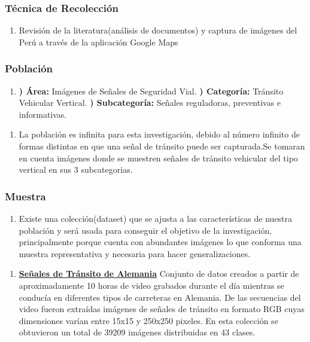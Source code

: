 		\subsubsection{Técnica de Recolección}
		\begin{enumerate}		
			\item[]  Revisión de la literatura(análisis de documentos) y captura de imágenes del Perú a través de la aplicación Google Maps
		\end{enumerate}

		\subsubsection{Población} 
		\begin{enumerate}
		\item[]				
		{\bf *) Área:} Imágenes de Señales de Seguridad Vial.\vskip 0.1cm
		{\bf *) Categoría:} Tránsito Vehicular Vertical.\vskip 0.1cm
		{\bf *) Subcategoría:} Señales reguladoras, preventivas e informativas.\vskip 0.1cm
		\end{enumerate}

		\begin{enumerate}		
			\item[]  La población es infinita para esta investigación, debido al número infinito de formas distintas en que una señal de tránsito puede ser capturada.Se tomaran en cuenta imágenes donde se muestren señales de tránsito vehicular del tipo vertical en sus 3 subcategorias.
		\end{enumerate}

		\subsubsection{Muestra} 
		\begin{enumerate}		
			\item[]	Existe una colección(dataset) que se ajusta a las características de nuestra población y será usada para conseguir el objetivo de la investigación, principalmente porque cuenta con abundantes imágenes lo que conforma una muestra representativa y necesaria para hacer generalizaciones. 
		\end{enumerate}

		\begin{enumerate}
			\item[]  {\bf \underline {Señales de Tránsito de Alemania}}\newline
			Conjunto de datos creados a partir de aproximadamente 10 horas de video grabados durante el día mientras se conducía en diferentes tipos de carreteras en Alemania. De las secuencias del video fueron extraídas imágenes de señales de tránsito en formato RGB cuyas dimensiones varían entre 15x15 y 250x250 pixeles. En esta colección se obtuvieron un total de 39209 imágenes distribuidas en 43 clases.  \citep{Stallkamp-IJCNN-2011} 
		\end{enumerate}

